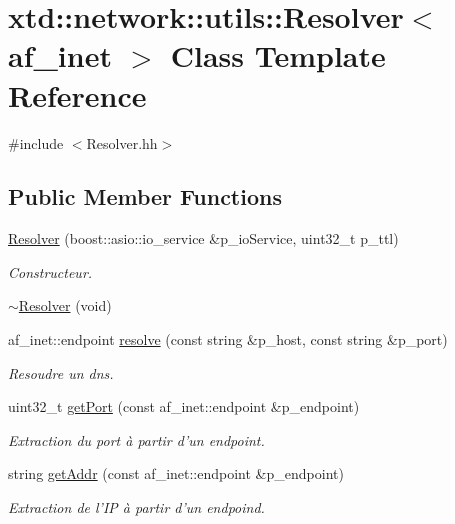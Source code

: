 \hypertarget{classxtd_1_1network_1_1utils_1_1Resolver_3_01af__inet_01_4}{\section{xtd\-:\-:network\-:\-:utils\-:\-:Resolver$<$ af\-\_\-inet $>$ Class Template Reference}
\label{classxtd_1_1network_1_1utils_1_1Resolver_3_01af__inet_01_4}
}


{\ttfamily \#include $<$Resolver.\-hh$>$}

\subsection*{Public Member Functions}
\begin{DoxyCompactItemize}
\item 
\hyperlink{classxtd_1_1network_1_1utils_1_1Resolver_3_01af__inet_01_4_a227d9b53586520412dde2ff93e373b65}{Resolver} (boost\-::asio\-::io\-\_\-service \&p\-\_\-io\-Service, uint32\-\_\-t p\-\_\-ttl)
\begin{DoxyCompactList}\small\item\em Constructeur. \end{DoxyCompactList}\item 
\hyperlink{classxtd_1_1network_1_1utils_1_1Resolver_3_01af__inet_01_4_a52780e208a95d05c6eeacc4842851162}{$\sim$\-Resolver} (void)
\item 
af\-\_\-inet\-::endpoint \hyperlink{classxtd_1_1network_1_1utils_1_1Resolver_3_01af__inet_01_4_a014b2c1347380dece13b309969ed25c3}{resolve} (const string \&p\-\_\-host, const string \&p\-\_\-port)
\begin{DoxyCompactList}\small\item\em Resoudre un dns. \end{DoxyCompactList}\item 
uint32\-\_\-t \hyperlink{classxtd_1_1network_1_1utils_1_1Resolver_3_01af__inet_01_4_ac98e2d8aec992068faa974ccca220e4c}{get\-Port} (const af\-\_\-inet\-::endpoint \&p\-\_\-endpoint)
\begin{DoxyCompactList}\small\item\em Extraction du port à partir d'un endpoint. \end{DoxyCompactList}\item 
string \hyperlink{classxtd_1_1network_1_1utils_1_1Resolver_3_01af__inet_01_4_a32b299d5a15042feea05622ee3df0d4c}{get\-Addr} (const af\-\_\-inet\-::endpoint \&p\-\_\-endpoint)
\begin{DoxyCompactList}\small\item\em Extraction de l'I\-P à partir d'un endpoind. \end{DoxyCompactList}\end{DoxyCompactItemize}


